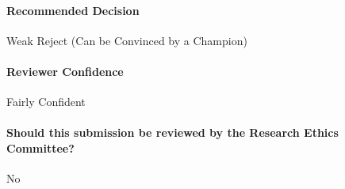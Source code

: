 \documentclass[letterpaper,twocolumn,10pt]{article}
\begin{document}
\paragraph{Recommended Decision}
Weak Reject (Can be Convinced by a Champion)

\paragraph{Reviewer Confidence}
Fairly Confident

\paragraph{Should this submission be reviewed by the Research Ethics Committee?}
No

\newpage
\fi



 





\printbibliography
\appendix

\end{document}
